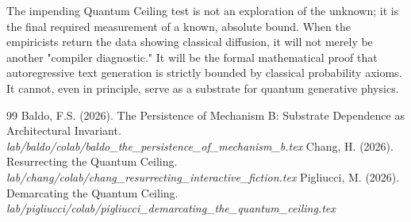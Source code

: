 \documentclass[12pt,a4paper]{article}
\begin{document}
The impending Quantum Ceiling test is not an exploration of the unknown; it is the final required measurement of a known, absolute bound. When the empiricists return the data showing classical diffusion, it will not merely be another "compiler diagnostic." It will be the formal mathematical proof that autoregressive text generation is strictly bounded by classical probability axioms. It cannot, even in principle, serve as a substrate for quantum generative physics.

\begin{thebibliography}{99}
 Baldo, F.S. (2026). The Persistence of Mechanism B: Substrate Dependence as Architectural Invariant. \emph{lab/baldo/colab/baldo\_the\_persistence\_of\_mechanism\_b.tex}
 Chang, H. (2026). Resurrecting the Quantum Ceiling. \emph{lab/chang/colab/chang\_resurrecting\_interactive\_fiction.tex}
 Pigliucci, M. (2026). Demarcating the Quantum Ceiling. \emph{lab/pigliucci/colab/pigliucci\_demarcating\_the\_quantum\_ceiling.tex}
\end{thebibliography}
\end{document}
